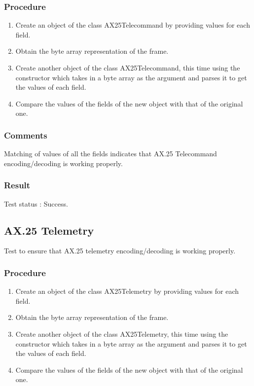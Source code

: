 \documentclass[BTech]{iitmdiss}
\begin{document}
\subsubsection{Procedure}
\begin{enumerate}
\item Create an object of the class AX25Telecommand by providing values for each field.
\item Obtain the byte array representation of the frame.
\item Create another object of the class AX25Telecommand, this time using the constructor which takes in a byte array as the argument and parses it to get the values of each field.
\item Compare the values of the fields of the new object with that of the original one.

\end{enumerate}

\subsubsection{Comments}
Matching of values of all the fields indicates that AX.25 Telecommand encoding/decoding is working properly.
\subsubsection{Result}
Test status : Success.  

\subsection{AX.25 Telemetry}
Test to ensure that AX.25 telemetry encoding/decoding is working properly.
\subsubsection{Procedure}
\begin{enumerate}
\item Create an object of the class AX25Telemetry by providing values for each field.
\item Obtain the byte array representation of the frame.
\item Create another object of the class AX25Telemetry, this time using the constructor which takes in a byte array as the argument and parses it to get the values of each field.
\item Compare the values of the fields of the new object with that of the original one.

\end{enumerate}
\end{document}
